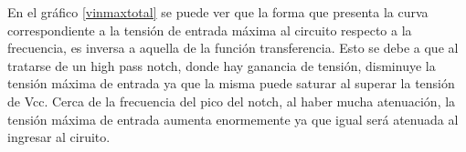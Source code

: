 En el gr\'afico \ref{vinmaxtotal} se puede ver que la forma que presenta la curva correspondiente a la tensi\'on de entrada m\'axima al circuito respecto a la frecuencia, es inversa a aquella de la funci\'on transferencia. Esto se debe a que al tratarse de un high pass notch, donde hay ganancia de tensi\'on, disminuye la tensi\'on m\'axima de entrada ya que la misma puede saturar al superar la tensi\'on de Vcc. Cerca de la frecuencia del pico del notch, al haber mucha atenuaci\'on, la tensi\'on m\'axima de entrada aumenta enormemente ya que igual ser\'a atenuada al ingresar al ciruito.